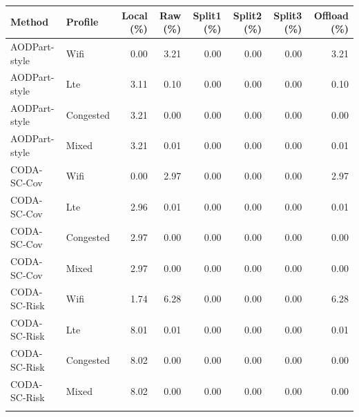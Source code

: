 \begin{tabular}{llrrrrrr}
\toprule
Method & Profile & Local (\%) & Raw (\%) & Split1 (\%) & Split2 (\%) & Split3 (\%) & Offload (\%) \\
\midrule
AODPart-style & Wifi & 0.00 & 3.21 & 0.00 & 0.00 & 0.00 & 3.21 \\
AODPart-style & Lte & 3.11 & 0.10 & 0.00 & 0.00 & 0.00 & 0.10 \\
AODPart-style & Congested & 3.21 & 0.00 & 0.00 & 0.00 & 0.00 & 0.00 \\
AODPart-style & Mixed & 3.21 & 0.01 & 0.00 & 0.00 & 0.00 & 0.01 \\
\addlinespace
CODA-SC-Cov & Wifi & 0.00 & 2.97 & 0.00 & 0.00 & 0.00 & 2.97 \\
CODA-SC-Cov & Lte & 2.96 & 0.01 & 0.00 & 0.00 & 0.00 & 0.01 \\
CODA-SC-Cov & Congested & 2.97 & 0.00 & 0.00 & 0.00 & 0.00 & 0.00 \\
CODA-SC-Cov & Mixed & 2.97 & 0.00 & 0.00 & 0.00 & 0.00 & 0.00 \\
\addlinespace
CODA-SC-Risk & Wifi & 1.74 & 6.28 & 0.00 & 0.00 & 0.00 & 6.28 \\
CODA-SC-Risk & Lte & 8.01 & 0.01 & 0.00 & 0.00 & 0.00 & 0.01 \\
CODA-SC-Risk & Congested & 8.02 & 0.00 & 0.00 & 0.00 & 0.00 & 0.00 \\
CODA-SC-Risk & Mixed & 8.02 & 0.00 & 0.00 & 0.00 & 0.00 & 0.00 \\
\addlinespace
\bottomrule
\end{tabular}
